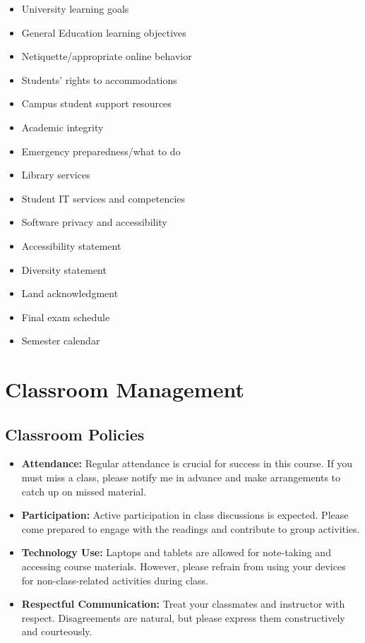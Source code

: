 \documentclass[12pt]{article}     %
\begin{document}
\begin{itemize}
\item University learning goals
\item General Education learning objectives
\item Netiquette/appropriate online behavior
\item Students' rights to accommodations
\item Campus student support resources
\item Academic integrity
\item Emergency preparedness/what to do
\item Library services
\item Student IT services and competencies
\item Software privacy and accessibility
\item Accessibility statement
\item Diversity statement
\item Land acknowledgment
\item Final exam schedule
\item Semester calendar
\end{itemize}

\section{Classroom Management}
\subsection*{Classroom Policies}
\begin{itemize}
    \item \textbf{Attendance:} Regular attendance is crucial for success in this course. If you must miss a class, please notify me in advance and make arrangements to catch up on missed material.
    \item \textbf{Participation:} Active participation in class discussions is expected. Please come prepared to engage with the readings and contribute to group activities.
    \item \textbf{Technology Use:} Laptops and tablets are allowed for note-taking and accessing course materials. However, please refrain from using your devices for non-class-related activities during class.
    \item \textbf{Respectful Communication:} Treat your classmates and instructor with respect. Disagreements are natural, but please express them constructively and courteously.
\end{itemize}
\end{document}
